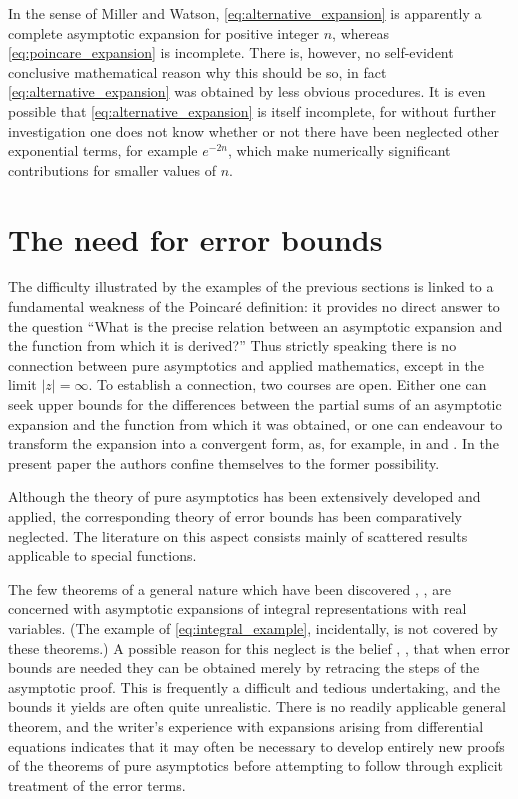 \documentclass{article}
\begin{document}
In the sense of Miller and Watson, \eqref{eq:alternative_expansion} is
apparently a complete asymptotic expansion for positive integer $n$, whereas
\eqref{eq:poincare_expansion} is incomplete. There is, however, no
self-evident conclusive mathematical reason why this should be so, in fact
\eqref{eq:alternative_expansion} was obtained by less obvious procedures. It
is even possible that \eqref{eq:alternative_expansion} is itself incomplete,
for without further investigation one does not know whether or not there have
been neglected other exponential terms, for example $e^{- 2 n}$, which make
numerically significant contributions for smaller values of $n$.

\section{The need for error bounds}\label{sec:need_error_bounds}

The difficulty illustrated by the examples of the previous sections is linked
to a fundamental weakness of the Poincar{\'e} definition: it provides no
direct answer to the question ``What is the precise relation between an
asymptotic expansion and the function from which it is derived?'' Thus
strictly speaking there is no connection between pure asymptotics and applied
mathematics, except in the limit $|z| = \infty$. To establish a connection,
two courses are open. Either one can seek upper bounds for the differences
between the partial sums of an asymptotic expansion and the function from
which it was obtained, or one can endeavour to transform the expansion into a
convergent form, as, for example, in {\cite{reference17}} and
{\cite{reference19}}. In the present paper the authors confine themselves to
the former possibility.

Although the theory of pure asymptotics has been extensively developed and
applied, the corresponding theory of error bounds has been comparatively
neglected. The literature on this aspect consists mainly of scattered results
applicable to special functions.

The few theorems of a general nature which have been discovered
{\cite{reference3}}, {\cite{reference5}}, are concerned with asymptotic
expansions of integral representations with real variables. (The example of
\eqref{eq:integral_example}, incidentally, is not covered by these theorems.)
A possible reason for this neglect is the belief {\cite{reference1}},
{\cite{reference17}}, that when error bounds are needed they can be obtained
merely by retracing the steps of the asymptotic proof. This is frequently a
difficult and tedious undertaking, and the bounds it yields are often quite
unrealistic. There is no readily applicable general theorem, and the writer's
experience with expansions arising from differential equations indicates that
it may often be necessary to develop entirely new proofs of the theorems of
pure asymptotics before attempting to follow through explicit treatment of the
error terms.
\end{document}
